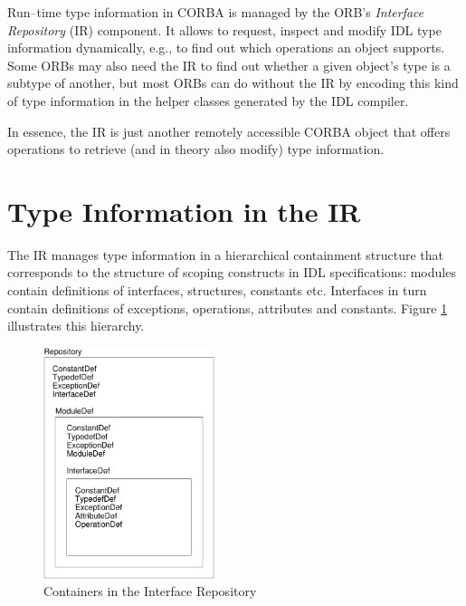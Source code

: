 %
%

Run--time  type information  in CORBA  is  managed by  the ORB's  {\it
Interface Repository}  (IR) component.  It allows  to request, inspect
and modify IDL  type information dynamically, e.g., to  find out which
operations an object supports. Some ORBs  may also need the IR to find
out whether  a given object's type  is a subtype of  another, but most
ORBs can do  without the IR by encoding this  kind of type information
in the helper classes generated by the IDL compiler.

In essence,  the IR is  just another remotely accessible  CORBA object
that offers  operations to retrieve  (and in theory also  modify) type
information.

\section{Type Information in the IR}

The  IR  manages  type   information  in  a  hierarchical  containment
structure that  corresponds to the structure of  scoping constructs in
IDL  specifications:   modules  contain  definitions   of  interfaces,
structures, constants  etc. Interfaces in turn  contain definitions of
exceptions, operations, attributes  and constants. Figure \ref{IR-fig}
illustrates this hierarchy.

\begin{figure}[htb]
  \begin{center}
    \includegraphics[width=5cm]{IFR/IR}
  \end{center}
\caption{Containers in the Interface Repository}
\label{IR-fig}
\end{figure}

